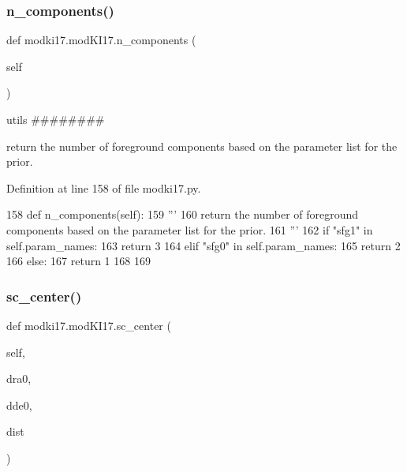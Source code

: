\subsubsection{\texorpdfstring{n\+\_\+components()}{n\_components()}}
{\footnotesize\ttfamily def modki17.\+mod\+K\+I17.\+n\+\_\+components (\begin{DoxyParamCaption}\item[{}]{self }\end{DoxyParamCaption})}



utils \#\#\#\#\#\#\#\# 

\begin{DoxyVerb}return the number of foreground components based on the parameter list for the prior.
\end{DoxyVerb}
 

Definition at line 158 of file modki17.\+py.


\begin{DoxyCode}
158     \textcolor{keyword}{def }n\_components(self):
159         \textcolor{stringliteral}{'''}
160 \textcolor{stringliteral}{        return the number of foreground components based on the parameter list for the prior.}
161 \textcolor{stringliteral}{        '''}
162         \textcolor{keywordflow}{if} \textcolor{stringliteral}{"sfg1"} \textcolor{keywordflow}{in} self.param\_names:
163             \textcolor{keywordflow}{return} 3
164         \textcolor{keywordflow}{elif} \textcolor{stringliteral}{"sfg0"} \textcolor{keywordflow}{in} self.param\_names:
165             \textcolor{keywordflow}{return} 2
166         \textcolor{keywordflow}{else}:
167             \textcolor{keywordflow}{return} 1
168     
169     
\end{DoxyCode}
\mbox{\label{classmodki17_1_1modKI17_ad898986b5d2781fbf18c5778d393805a}} 
\subsubsection{\texorpdfstring{sc\+\_\+center()}{sc\_center()}}
{\footnotesize\ttfamily def modki17.\+mod\+K\+I17.\+sc\+\_\+center (\begin{DoxyParamCaption}\item[{}]{self,  }\item[{}]{dra0,  }\item[{}]{dde0,  }\item[{}]{dist }\end{DoxyParamCaption})}



